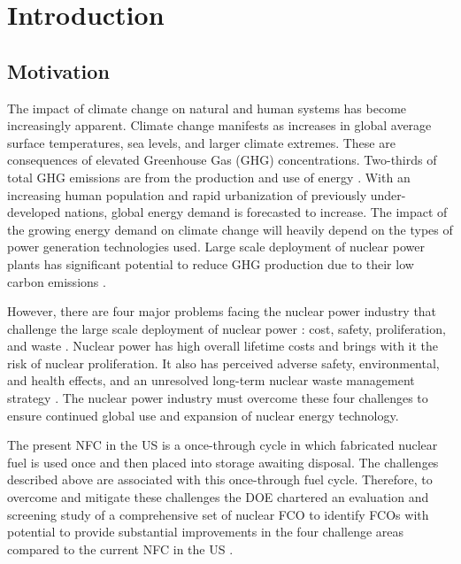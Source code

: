 \chapter[Introduction]{Introduction}
\label{chap:1}

\section{Motivation}

The impact of climate change on natural and human systems has 
become increasingly apparent.
Climate change manifests as increases in global average 
surface temperatures, sea levels, and larger climate extremes.
These are consequences of elevated Greenhouse Gas (GHG) 
concentrations. 
Two-thirds of total GHG emissions are from the production 
and use of energy \cite{noauthor_climate_2018}. 
With an increasing human population and rapid urbanization 
of previously under-developed nations, global energy demand is 
forecasted to increase. 
The impact of the growing energy demand on climate change 
will heavily depend on the 
types of power generation technologies used. 
Large scale deployment of nuclear power plants has significant 
potential to reduce GHG production due to their low 
carbon emissions \cite{noauthor_climate_2018}.  


However, there are four major problems facing the nuclear power 
industry
that challenge the large scale deployment of nuclear power 
: cost, safety, proliferation, and waste 
\cite{massachusetts_institute_of_technology_future_2003}. 
Nuclear power has high overall lifetime costs and brings 
with it the risk of nuclear proliferation. 
It also has perceived adverse safety, environmental, and health 
effects, and an unresolved long-term nuclear waste management 
strategy \cite{massachusetts_institute_of_technology_future_2003}. 
The nuclear power industry must overcome these four challenges 
to ensure continued global use and expansion 
of nuclear energy technology. 

The present \gls{NFC} in the \gls{US} is a once-through cycle 
in which fabricated nuclear fuel is used once and then placed into 
storage awaiting disposal. 
The challenges described above are associated with this 
once-through fuel cycle. 
Therefore, to overcome and mitigate these challenges the 
\gls{DOE} chartered an evaluation and screening study 
of a comprehensive set of nuclear \gls{FCO} 
to identify \glspl{FCO} with potential 
to provide substantial improvements in the four challenge areas
compared to the current 
\gls{NFC} in the \gls{US} \cite{wigeland_nuclear_2014}. 

